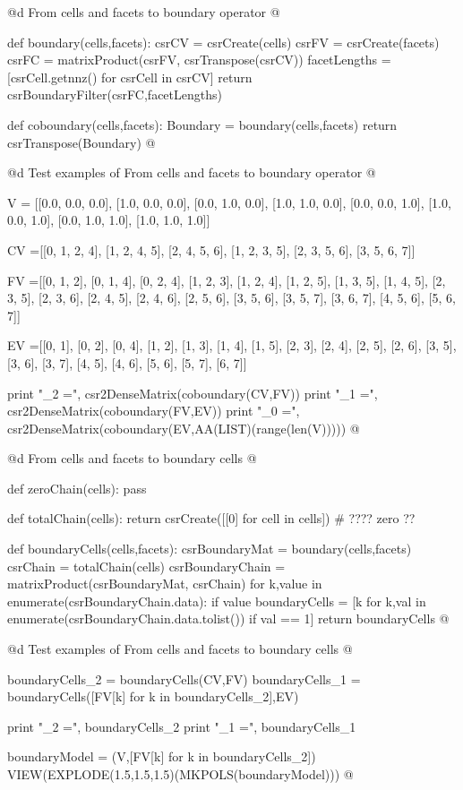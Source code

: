 \documentclass[11pt,oneside]{article}	%
\begin{document}
@d From cells and facets to boundary operator
@{def boundary(cells,facets):
    csrCV = csrCreate(cells)
    csrFV = csrCreate(facets)
    csrFC = matrixProduct(csrFV, csrTranspose(csrCV))
    facetLengths = [csrCell.getnnz() for csrCell in csrCV]
    return csrBoundaryFilter(csrFC,facetLengths)

def coboundary(cells,facets):
    Boundary = boundary(cells,facets)
    return csrTranspose(Boundary)
@}
@d Test examples of From cells and facets to boundary operator
@{V = [[0.0, 0.0, 0.0], [1.0, 0.0, 0.0], [0.0, 1.0, 0.0], [1.0, 1.0, 0.0], 
[0.0, 0.0, 1.0], [1.0, 0.0, 1.0], [0.0, 1.0, 1.0], [1.0, 1.0, 1.0]]

CV =[[0, 1, 2, 4], [1, 2, 4, 5], [2, 4, 5, 6], [1, 2, 3, 5], [2, 3, 5, 6], 
[3, 5, 6, 7]]

FV =[[0, 1, 2], [0, 1, 4], [0, 2, 4], [1, 2, 3], [1, 2, 4], [1, 2, 5], 
[1, 3, 5], [1, 4, 5], [2, 3, 5], [2, 3, 6], [2, 4, 5], [2, 4, 6], [2, 5, 6], 
[3, 5, 6], [3, 5, 7], [3, 6, 7], [4, 5, 6], [5, 6, 7]]

EV =[[0, 1], [0, 2], [0, 4], [1, 2], [1, 3], [1, 4], [1, 5], [2, 3], [2, 4], 
[2, 5], [2, 6], [3, 5], [3, 6], [3, 7], [4, 5], [4, 6], [5, 6], [5, 7], 
[6, 7]]

print "\ncoboundary_2 =\n", csr2DenseMatrix(coboundary(CV,FV))
print "\ncoboundary_1 =\n", csr2DenseMatrix(coboundary(FV,EV))
print "\ncoboundary_0 =\n", csr2DenseMatrix(coboundary(EV,AA(LIST)(range(len(V)))))
@}
@d From cells and facets to boundary cells
@{def zeroChain(cells):
	pass

def totalChain(cells):
	return csrCreate([[0] for cell in cells])  # ????  zero ??

def boundaryCells(cells,facets):
	csrBoundaryMat = boundary(cells,facets)
	csrChain = totalChain(cells)
	csrBoundaryChain = matrixProduct(csrBoundaryMat, csrChain)
	for k,value in enumerate(csrBoundaryChain.data):
		if value %
	boundaryCells = [k for k,val in enumerate(csrBoundaryChain.data.tolist()) if val == 1]
	return boundaryCells
@}
@d Test examples of From cells and facets to boundary cells
@{boundaryCells_2 = boundaryCells(CV,FV)
boundaryCells_1 = boundaryCells([FV[k] for k in boundaryCells_2],EV)

print "\nboundaryCells_2 =\n", boundaryCells_2
print "\nboundaryCells_1 =\n", boundaryCells_1

boundaryModel = (V,[FV[k] for k in boundaryCells_2])
VIEW(EXPLODE(1.5,1.5,1.5)(MKPOLS(boundaryModel)))
@}
\end{document}
